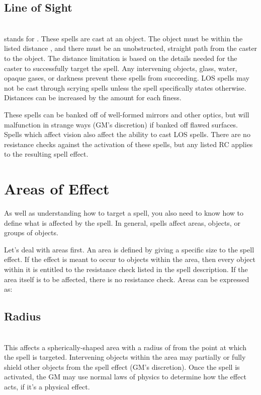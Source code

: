 \begin{multicols}{2}
\subsection{Line of Sight}
\\
\LOS stands for . These spells are cast at an object. The object must be within the listed distance , and there must be an unobstructed, straight path from the caster to the object. The distance limitation is based on the details needed for the caster to successfully target the spell. Any intervening objects, glass, water, opaque gases, or darkness prevent these spells from succeeding. LOS spells may not be cast through scrying spells unless the spell specifically states otherwise. Distances can be increased by the amount  for each finess.

These spells can be banked off of well-formed mirrors and other optics, but will malfunction in strange ways (GM's discretion) if banked off flawed surfaces. Spells which affect vision also affect the ability to cast LOS spells.  There are no resistance checks against the activation of these spells, but any listed RC applies to the resulting spell effect.
\section{Areas of Effect}
As well as understanding how to target a spell, you also need to know how to define what is affected by the spell. In general, spells affect areas, objects, or groups of objects.

Let's deal with areas first. An area is defined by giving a specific size to the spell effect. If the effect is meant to occur to objects within the area, then every object within it is entitled to the resistance check listed in the spell description. If the area itself is to be affected, there is no resistance check. Areas can be expressed as:
\subsection{Radius}
\\
This affects a spherically-shaped area with a radius of  from the point at which the spell is targeted. Intervening objects within the area may partially or fully shield other objects from the spell effect (GM's discretion). Once the spell is activated, the GM may use normal laws of physics to determine how the effect acts, if it's a physical effect.

\end{multicols}
